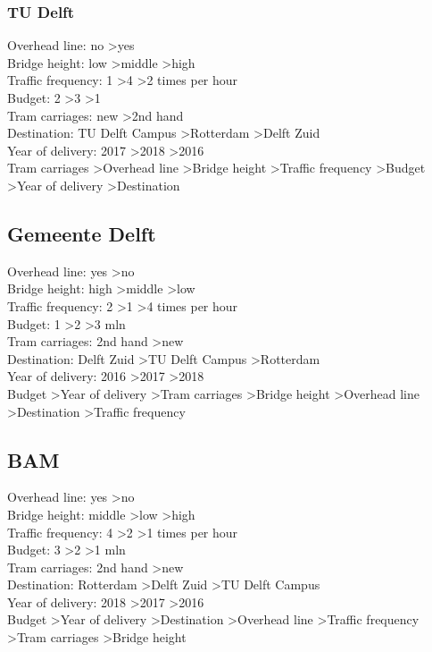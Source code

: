\documentclass{article}
\begin{document}
\subsubsection{TU Delft}
Overhead line: no \textgreater yes \\
Bridge height: low \textgreater middle \textgreater high \\
Traffic frequency: 1 \textgreater 4 \textgreater 2 times per hour \\
Budget: 2 \textgreater 3 \textgreater 1 \\
Tram carriages: new \textgreater 2nd hand \\
Destination: TU Delft Campus \textgreater Rotterdam \textgreater Delft Zuid \\
Year of delivery: 2017 \textgreater 2018 \textgreater 2016 \\

Tram carriages \textgreater Overhead line \textgreater Bridge height \textgreater Traffic frequency \textgreater Budget \textgreater Year of delivery \textgreater Destination\\


\subsection{Gemeente Delft}
Overhead line: yes \textgreater no \\
Bridge height: high \textgreater middle \textgreater low \\
Traffic frequency: 2 \textgreater 1 \textgreater 4 times per hour \\
Budget: 1 \textgreater 2 \textgreater 3 mln \\
Tram carriages: 2nd hand \textgreater new \\
Destination: Delft Zuid \textgreater TU Delft Campus \textgreater Rotterdam \\
Year of delivery: 2016 \textgreater 2017 \textgreater 2018 \\

Budget \textgreater Year of delivery \textgreater Tram carriages \textgreater Bridge height \textgreater Overhead line \textgreater Destination \textgreater Traffic frequency\\


\subsection{BAM}
Overhead line: yes \textgreater no \\
Bridge height: middle \textgreater low \textgreater high \\
Traffic frequency: 4 \textgreater 2 \textgreater 1 times per hour \\
Budget: 3 \textgreater 2 \textgreater 1 mln \\
Tram carriages: 2nd hand \textgreater new \\
Destination: Rotterdam \textgreater Delft Zuid \textgreater TU Delft Campus \\
Year of delivery: 2018 \textgreater 2017 \textgreater 2016 \\

Budget \textgreater Year of delivery \textgreater Destination \textgreater Overhead line \textgreater Traffic frequency \textgreater Tram carriages \textgreater Bridge height\\
\end{document}
